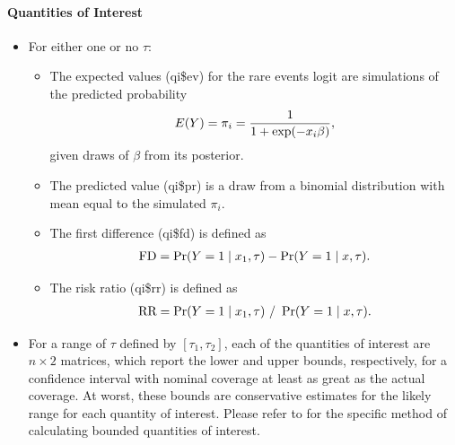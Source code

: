 \documentclass[letterpaper,10pt,english]{sphinxmanual}
\begin{document}
\paragraph{Quantities of Interest}
\label{zelig-relogit:quantities-of-interest}\begin{itemize}
\item {} 
For either one or no \(\tau\):
\begin{itemize}
\item {} 
The expected values (qi\$ev) for the rare events logit are
simulations of the predicted probability
\begin{gather}
\begin{split}E(Y) = \pi_i =
    \frac{1}{1 + \exp(-x_i \beta)},\end{split}\notag
\end{gather}
given draws of \(\beta\) from its posterior.

\item {} 
The predicted value (qi\$pr) is a draw from a binomial distribution
with mean equal to the simulated \(\pi_i\).

\item {} 
The first difference (qi\$fd) is defined as
\begin{gather}
\begin{split}\textrm{FD} = \Pr(Y = 1 \mid x_1, \tau) - \Pr(Y = 1 \mid x, \tau).\end{split}\notag
\end{gather}
\item {} 
The risk ratio (qi\$rr) is defined as
\begin{gather}
\begin{split}\textrm{RR} = \Pr(Y = 1 \mid x_1, \tau) \ / \ \Pr(Y = 1 \mid x, \tau).\end{split}\notag
\end{gather}
\end{itemize}

\item {} 
For a range of \(\tau\) defined by \([\tau_1, \tau_2]\), each
of the quantities of interest are \(n \times 2\) matrices, which
report the lower and upper bounds, respectively, for a confidence
interval with nominal coverage at least as great as the actual
coverage. At worst, these bounds are conservative estimates for the
likely range for each quantity of interest. Please refer to for the
specific method of calculating bounded quantities of interest.


\end{itemize}
\end{document}
